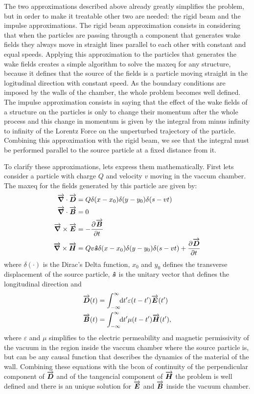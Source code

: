 \documentclass[
	12pt,				%
	openright,			%
	oneside,			%
	a4paper,		%
	chapter=TITLE,		%
	section=TITLE,		%
    brazil,				%
	english,			%
	sumario=tradicional,
	]{abntex2}
\begin{document}
  The two approximations described above already greatly simplifies the problem, but in order to make it treatable other two are needed: the rigid beam and the impulse approximations. The rigid beam approximation consists in considering that when the particles are passing througth a component that generates wake fields they always move in straight lines parallel to each other with constant and equal speeds. Applying this approximation to the particles that generates the wake fields creates a simple algorithm to solve the \gls{maxeq} for any structure, because it defines that the source of the fields is a particle moving straight in the logitudinal direction with constant speed. As the boundary conditions are imposed by the walls of the chamber, the whole problem becomes well defined. The impulse approximation consists in saying that the effect of the wake fields of a structure on the particles is only to change their momentum after the whole process and this change in momentum is given by the integral from minus infinity to infinity of the Lorentz Force on the unperturbed trajectory of the particle. Combining this approximation with the rigid beam, we see that the integral must be performed parallel to the source particle at a fixed distance from it.

  To clarify these approximations, lets express them mathematically. First lets consider a particle with charge $Q$ and velocity $v$  moving in the vaccum chamber. The \gls{maxeq} for the fields generated by this particle are given by:
  \begin{align}\label{eq:maxeq}
	  \nonumber
      \overrightarrow{\boldsymbol{\nabla}}\cdot\overrightarrow{\boldsymbol{D}} &= Q\delta(x-x_0)\delta(y-y_0)\delta(s-vt)\\ \nonumber
	  \overrightarrow{\boldsymbol{\nabla}}\cdot\overrightarrow{\boldsymbol{B}} &= 0\\
	  \overrightarrow{\boldsymbol{\nabla}}\times\overrightarrow{\boldsymbol{E}} &= -\frac{\partial^{{}}\overrightarrow{\boldsymbol{B}}}{\partial t^{{}}}\\
	  \nonumber
	  \overrightarrow{\boldsymbol{\nabla}}\times\overrightarrow{\boldsymbol{H}} &= Qv\boldsymbol{\hat s}\delta(x-x_0)\delta(y-y_0)\delta(s-vt) + \frac{\partial^{{}}\overrightarrow{\boldsymbol{D}}}{\partial t^{{}}}
  \end{align}
  where $\delta(\cdot)$ is the Dirac's Delta function, $x_0$ and $y_0$ defines the transverse displacement of the source particle, $\boldsymbol{\hat s}$ is the unitary vector that defines the longitudinal direction and
  \begin{align}
  	  \overrightarrow{\boldsymbol{D}}(t) &= \int_{-\infty}^{\infty}\!\!\text{d}t' \varepsilon(t-t')\overrightarrow{\boldsymbol{E}}(t')\\
	  \overrightarrow{\boldsymbol{B}}(t) &= \int_{-\infty}^{\infty}\!\!\text{d}t' \mu(t-t')\overrightarrow{\boldsymbol{H}}(t'),
  \end{align}
  where $\varepsilon$ and $\mu$ simplifies to the electric permeability and magnetic permissivity of the vacuum in the region inside the vaccum chamber where the source particle is, but can be any causal function that describes the dynamics of the material of the wall. Combining these equations with the \gls{bcon} of continuity of the perpendicular component of $\overrightarrow{\boldsymbol{D}}$ and of the tangencial component of $\overrightarrow{\boldsymbol{H}}$ the problem is well defined and there is an unique solution for $\overrightarrow{\boldsymbol{E}}$ and $\overrightarrow{\boldsymbol{B}}$ inside the vacuum chamber.
\end{document}
